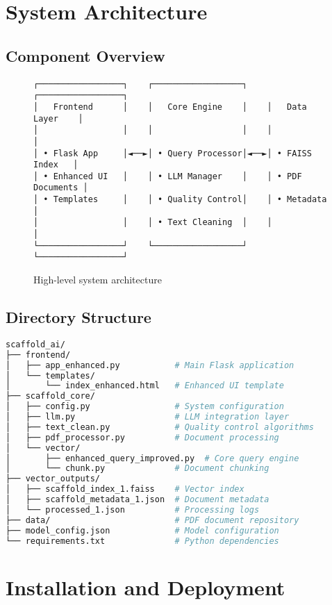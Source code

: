 \documentclass[12pt,a4paper]{article}
\begin{document}
\section{System Architecture}

\subsection{Component Overview}
\begin{figure}[H]
\centering
\begin{lstlisting}[language=text]
┌─────────────────┐    ┌──────────────────┐    ┌─────────────────┐
│   Frontend      │    │   Core Engine    │    │   Data Layer    │
│                 │    │                  │    │                 │
│ • Flask App     │◄──►│ • Query Processor│◄──►│ • FAISS Index   │
│ • Enhanced UI   │    │ • LLM Manager    │    │ • PDF Documents │
│ • Templates     │    │ • Quality Control│    │ • Metadata      │
│                 │    │ • Text Cleaning  │    │                 │
└─────────────────┘    └──────────────────┘    └─────────────────┘
\end{lstlisting}
\caption{High-level system architecture}
\end{figure}

\subsection{Directory Structure}
\begin{lstlisting}[language=bash]
scaffold_ai/
├── frontend/
│   ├── app_enhanced.py           # Main Flask application
│   └── templates/
│       └── index_enhanced.html   # Enhanced UI template
├── scaffold_core/
│   ├── config.py                 # System configuration
│   ├── llm.py                    # LLM integration layer
│   ├── text_clean.py             # Quality control algorithms
│   ├── pdf_processor.py          # Document processing
│   └── vector/
│       ├── enhanced_query_improved.py  # Core query engine
│       └── chunk.py              # Document chunking
├── vector_outputs/
│   ├── scaffold_index_1.faiss    # Vector index
│   ├── scaffold_metadata_1.json  # Document metadata
│   └── processed_1.json          # Processing logs
├── data/                         # PDF document repository
├── model_config.json             # Model configuration
└── requirements.txt              # Python dependencies
\end{lstlisting}

\section{Installation and Deployment}
\end{document}
